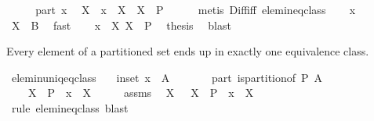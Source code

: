 \begin{isabellebody}
%
\isadelimproof
\isanewline
%
\endisadelimproof
%
\isatagproof
{}\isamarkupfalse%
\ {\isacharminus}\isanewline
\ \ \isamarkupfalse%
\ part\ x\ \isamarkupfalse%
\ X\ \ {\isachardoublequoteopen}x\ {\isasymin}\ X{\isachardoublequoteclose}\ \ {\isachardoublequoteopen}X\ {\isasymin}\ P{\isachardoublequoteclose}\isanewline
\ \ \ \ \isamarkupfalse%
\ {\isacharparenleft}metis\ Diff{\isacharunderscore}iff\ elem{\isacharunderscore}in{\isacharunderscore}eq{\isacharunderscore}class{\isacharparenright}\isanewline
\ \ \isamarkupfalse%
\ x\ \isamarkupfalse%
\ {\isachardoublequoteopen}X\ {\isasymnoteq}\ B{\isachardoublequoteclose}\ \isamarkupfalse%
\ fast\isanewline
\ \ \isamarkupfalse%
\ {\isacharbackquoteopen}x\ {\isasymin}\ X{\isacharbackquoteclose}\ {\isacharbackquoteopen}X\ {\isasymin}\ P{\isacharbackquoteclose}\ \isamarkupfalse%
\ {\isacharquery}thesis\ \isamarkupfalse%
\ blast\isanewline
{}\isamarkupfalse%
%
\endisatagproof
{\isafoldproof}%
%
\isadelimproof
%
\endisadelimproof
%
\begin{isamarkuptext}%
Every element of a partitioned set ends up in exactly one equivalence class.%
\end{isamarkuptext}%
\isamarkuptrue%
\isamarkupfalse%
\ elem{\isacharunderscore}in{\isacharunderscore}uniq{\isacharunderscore}eq{\isacharunderscore}class{\isacharcolon}\isanewline
\ \ \ in{\isacharunderscore}set{\isacharcolon}\ {\isachardoublequoteopen}x\ {\isasymin}\ A{\isachardoublequoteclose}\isanewline
\ \ \ \ \ \ \ part{\isacharcolon}\ {\isachardoublequoteopen}is{\isacharunderscore}partition{\isacharunderscore}of\ P\ A{\isachardoublequoteclose}\isanewline
\ \ \ {\isachardoublequoteopen}{\isasymexists}{\isacharbang}\ X\ {\isasymin}\ P\ {\isachardot}\ x\ {\isasymin}\ X{\isachardoublequoteclose}\isanewline
%
\isadelimproof
%
\endisadelimproof
%
\isatagproof
{}\isamarkupfalse%
\ {\isacharminus}\isanewline
\ \ \isamarkupfalse%
\ assms\ \isamarkupfalse%
\ X\ \ {\isacharasterisk}{\isacharcolon}\ {\isachardoublequoteopen}X\ {\isasymin}\ P\ {\isasymand}\ x\ {\isasymin}\ X{\isachardoublequoteclose}\isanewline
\ \ \ \ \isamarkupfalse%
\ {\isacharparenleft}rule\ elem{\isacharunderscore}in{\isacharunderscore}eq{\isacharunderscore}class{\isacharparenright}\ blast\isanewline

\end{isabellebody}
